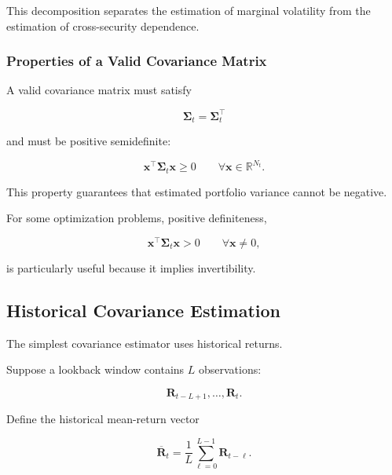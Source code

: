 \documentclass[11pt,a4paper]{article}
\begin{document}
This decomposition separates the estimation of marginal volatility from the
estimation of cross-security dependence.


\subsubsection{Properties of a Valid Covariance Matrix}

A valid covariance matrix must satisfy

\begin{equation}
\boldsymbol{\Sigma}_t
=
\boldsymbol{\Sigma}_t^\top
\end{equation}

and must be positive semidefinite:

\begin{equation}
\boxed{
\mathbf{x}^\top
\boldsymbol{\Sigma}_t
\mathbf{x}
\geq
0
\qquad
\forall
\mathbf{x}\in\mathbb{R}^{N_t}.
}
\end{equation}

This property guarantees that estimated portfolio variance cannot be negative.

For some optimization problems, positive definiteness,

\begin{equation}
\mathbf{x}^\top
\boldsymbol{\Sigma}_t
\mathbf{x}
>
0
\qquad
\forall\mathbf{x}\neq0,
\end{equation}

is particularly useful because it implies invertibility.


\subsection{Historical Covariance Estimation}
\label{subsec:historical_covariance}

The simplest covariance estimator uses historical returns.

Suppose a lookback window contains $L$ observations:

\begin{equation}
\mathbf{R}_{t-L+1},
\ldots,
\mathbf{R}_{t}.
\end{equation}

Define the historical mean-return vector

\begin{equation}
\overline{\mathbf{R}}_t
=
\frac{1}{L}
\sum_{\ell=0}^{L-1}
\mathbf{R}_{t-\ell}.
\end{equation}
\end{document}

